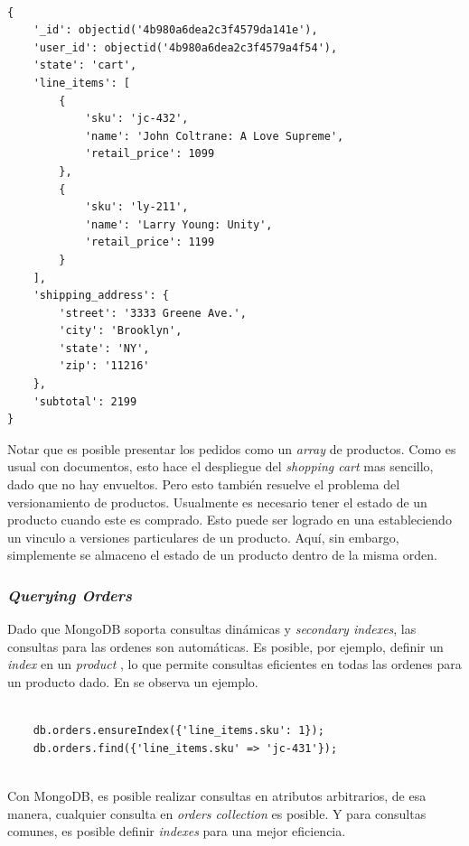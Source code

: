 \medskip
\begin{lstlisting}[caption= Estructura de una orden., label=source:javascript:example_schema_order]

{
	'_id': objectid('4b980a6dea2c3f4579da141e'),
	'user_id': objectid('4b980a6dea2c3f4579a4f54'),
	'state': 'cart',
	'line_items': [
		{
			'sku': 'jc-432',
			'name': 'John Coltrane: A Love Supreme',
			'retail_price': 1099
		},
		{
			'sku': 'ly-211',
			'name': 'Larry Young: Unity',
			'retail_price': 1199
		}
	],
	'shipping_address': {
		'street': '3333 Greene Ave.',
		'city': 'Brooklyn',
		'state': 'NY',
		'zip': '11216'
	},
	'subtotal': 2199
}
\end{lstlisting}

Notar que es posible presentar los pedidos como un \textit{array} de productos. Como es usual con documentos, esto hace el despliegue del \textit{shopping cart} mas sencillo, dado que no hay \joins envueltos. Pero esto también resuelve el problema del versionamiento de productos. Usualmente es necesario tener el estado de un producto cuando este es comprado. Esto puede ser logrado en una \rdbms estableciendo un vinculo a versiones particulares de un producto. Aquí, sin embargo, simplemente se almaceno el estado de un producto dentro de la misma orden.

\subsubsection{\textit{Querying Orders}}

Dado que MongoDB soporta consultas dinámicas y \textit{secondary indexes}, las consultas para las ordenes son automáticas. Es posible, por ejemplo, definir un \textit{index} en un \textit{product }, lo que permite consultas eficientes en todas las ordenes para un producto dado. En   se observa un ejemplo.

\medskip
\begin{lstlisting}[caption= Consulta eficiente con \textit{secondary indexes}., label=source:javascript:example_querying_orders_mongodb]

	db.orders.ensureIndex({'line_items.sku': 1});
	db.orders.find({'line_items.sku' => 'jc-431'});
	
\end{lstlisting}

Con MongoDB, es posible realizar consultas en atributos arbitrarios, de esa manera, cualquier consulta en \textit{orders collection} es posible. Y para consultas comunes, es posible definir \textit{indexes} para una mejor eficiencia.

